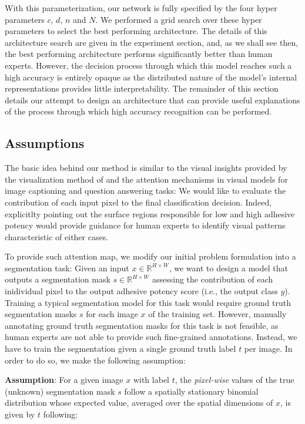 \documentclass[10pt,twocolumn,letterpaper]{article}
\begin{document}
With this parameterization, our network is fully specified by the four hyper parameters $c$, $d$, $n$ and $N$.
We performed a grid search over these hyper parameters to select the best performing architecture.
The details of this architecture search are given in the experiment section,
and, as we shall see then, the best performing architecture performs significantly better than human experts.
However, the decision process through which this model reaches such a high accuracy is entirely opaque
as the distributed nature of the model's internal representations provides little interpretability.
The remainder of this section details our attempt to design an architecture that can provide 
useful explanations of the process through which high accuracy recognition can be performed.

\subsection{Assumptions}
The basic idea behind our method is similar to the visual insights provided by the
visualization method of \cite{} and the attention mechanisms in visual models 
for image captioning and question answering tasks:
We would like to evaluate the contribution of each input pixel to the final classification decision.
Indeed, explicitlty pointing out the surface regions responsible 
for low and high adhesive potency would provide guidance for human experts to 
identify visual patterns characteristic of either cases.

To provide such attention map, we modify our initial problem formulation into a segmentation task:
Given an input $x \in \mathbb{R}^{H \times W}$, we want to design a model that outputs 
a segmentation mask $s \in \mathbb{R}^{H \times W}$ assessing the contribution of each inidividual pixel to the output adhesive potency score (i.e., the output class $y$).
Training a typical segmentation model for this task would require ground truth 
segmentation masks $s$ for each image $x$ of the training set.
However, manually annotating ground truth segmentation masks for this task is not feasible, 
as human experts are not able to provide such fine-grained annotations.
Instead, we have to train the segmentation given a single ground truth label $t$ per image.
In order to do so, we make the following assumption:

\textbf{Assumption}: 
For a given image $x$ with label $t$, 
the \textit{pixel-wise} values of the true (unknown) segmentation mask $s$
follow a spatially stationary binomial distribution whose expected value, 
averaged over the spatial dimensions of $x$, is given by $t$ following:
\end{document}

